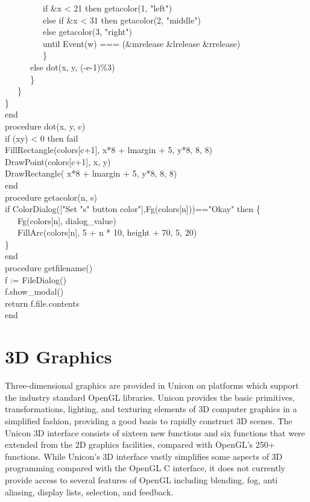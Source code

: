 {\>   \ \ \ \ \ \ \ \ \ if \&x {\textless} 21 then getacolor(1,
"left") \\
\>   \ \ \ \ \ \ \ \ \ else if \&x {\textless} 31 then getacolor(2,
"middle") \\
\>   \ \ \ \ \ \ \ \ \ else getacolor(3,
"right") \\
\>   \ \ \ \ \ \ \ \ \ until Event(w) === (\&mrelease {\textbar}
\&lrelease{\textbar} \&rrelease) \\
\>   \ \ \ \ \ \ \ \ \ \} \\
\>   \ \ \ \ \ \ else dot(x, y, (-e-1)\%3) \\
\>   \ \ \ \ \ \ \} \\
\>   \ \ \ \} \\
\>   \} \\
end
\ \\
procedure dot(x, y, c) \\
\>   if (x{\textbar}y) {\textless} 0 then fail \\
\>   FillRectangle(colors[c+1], x*8 + lmargin + 5, y*8, 8, 8) \\
\>   DrawPoint(colors[c+1], x, y) \\
\>   DrawRectangle( x*8 + lmargin + 5, y*8, 8, 8) \\
end
\ \\
procedure getacolor(n, s) \\
\>   if ColorDialog(["Set
"{\textbar}{\textbar}s{\textbar}{\textbar}"
button color"],Fg(colors[n]))=="Okay" then \{ \\
\>   \ \ \ Fg(colors[n], dialog\_value) \\
\>   \ \ \ FillArc(colors[n], 5 + n * 10, height + 70, 5, 20) \\
\>   \} \\
end
\ \\
procedure getfilename() \\
\>   f := FileDialog() \\
\>   f.show\_modal() \\
\>   return f.file.contents \\
end
}

\section{3D Graphics}

Three-dimensional graphics are provided in Unicon on platforms which
support the industry standard OpenGL libraries. Unicon provides the
basic primitives, transformations, lighting, and texturing elements of
3D computer graphics in a simplified fashion, providing a good basis
to rapidly construct 3D scenes. The Unicon 3D interface consists of
sixteen new functions and six functions that were extended from the 2D
graphics facilities, compared with OpenGL's 250+ functions. While
Unicon's 3D interface vastly simplifies some aspects of 3D programming
compared with the OpenGL C interface, it does not currently provide
access to several features of OpenGL including blending, fog, anti
aliasing, display lists, selection, and feedback.

